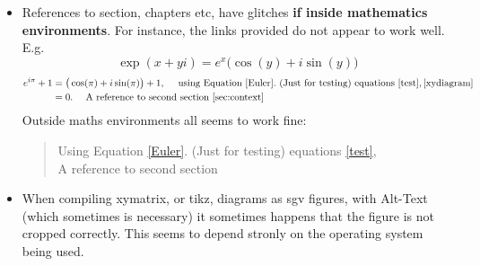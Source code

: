 \documentclass[a4paper,12pt]{article}
\newtheorem{Fundamental Theorem}{Fundamental Theorem}
\begin{document}
\begin{itemize}
\item References to section, chapters etc, have glitches \textbf{if inside mathematics environments}. For instance, the links provided do not appear to work well. E.g.
\begin{equation}\label{Euler}
 \exp(x+yi)=e^x\big (\cos(y)+i\sin(y) \big)
\end{equation}
\begin{align*}
 e^{i\pi}+1&=\big(\cos(\pi)+i\sin(\pi) \big)+1, \quad \textrm{ using Equation }  \eqref{Euler}.  \textrm{ (Just for testing) equations } \eqref{test}, \eqref{xydiagram}\\
           &=0. \quad \textrm{ A reference to second section } \protect \ref{sec:context}
\end{align*}
Outside maths environments all seems to work fine:
  \begin{quotation} Using  Equation   \eqref{Euler}.   (Just for testing) equations  \eqref{test}, \protect{\eqref{xydiagram}}\\  A reference to second section  \protect{\ref{sec:context}}
  \end{quotation}
\item When compiling xymatrix, or tikz, diagrams as sgv figures, with Alt-Text (which sometimes is necessary) it sometimes happens that the figure is not cropped correctly. This seems to depend stronly on the operating system being used.
\end{itemize}
\end{document}
